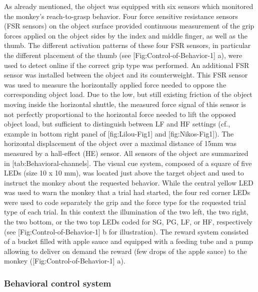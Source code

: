 As already mentioned, the object was equipped with six sensors which monitored the monkey's reach-to-grasp behavior. Four force sensitive resistance sensors (FSR sensors) on the object surface provided continuous measurement of the grip forces applied on the object sides by the index and middle finger, as well as the thumb. The different activation patterns of these four FSR sensors, in particular the different placement of the thumb (see [Fig:Control-of-Behavior-1] a), were used to detect online if the correct grip type was performed. An additional FSR sensor was installed between the object and its counterweight. This FSR sensor was used to measure the horizontally applied force needed to oppose the corresponding object load. Due to the low, but still existing friction of the object moving inside the horizontal shuttle, the measured force signal of this sensor is not perfectly proportional to the horizontal force needed to lift the opposed object load, but sufficient to distinguish between LF and HF settings (cf., example in bottom right panel of [fig:Lilou-Fig1] and [fig:Nikos-Fig1]). The horizontal displacement of the object over a maximal distance of 15mm was measured by a hall-effect (HE) sensor. All sensors of the object are summarized in [tab:Behavioral-channels]. The visual cue system, composed of a square of five LEDs (size 10 x 10 mm), was located just above the target object and used to instruct the monkey about the requested behavior. While the central yellow LED was used to warn the monkey that a trial had started, the four red corner LEDs were used to code separately the grip and the force type for the requested trial type of each trial. In this context the illumination of the two left, the two right, the two bottom, or the two top LEDs coded for SG, PG, LF, or HF, respectively (see [Fig:Control-of-Behavior-1] b for illustration). The reward system consisted of a bucket filled with apple sauce and equipped with a feeding tube and a pump allowing to deliver on demand the reward (few drops of the apple sauce) to the monkey ([Fig:Control-of-Behavior-1] a).

\subsubsection{Behavioral control system}

